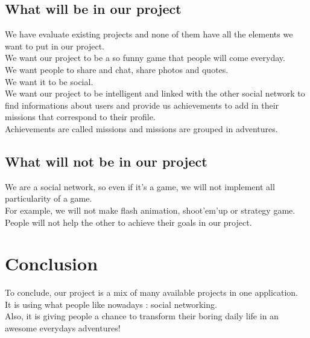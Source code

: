 \documentclass{life-en}
\begin{document}
\section{What will be in our project}

We have evaluate existing projects and none of them have all the elements we want to put in our project.\\

We want our project to be a so funny game that people will come everyday.\\

We want people to share and chat, share photos and quotes.\\

We want it to be social.\\

We want our project to be intelligent and linked with the other social network to find informations about users and provide us achievements to add in their missions that correspond to their profile.\\

Achievements are called missions and missions are grouped in adventures.

\section{What will not be in our project}

We are a social network, so even if it’s a game, we  will not implement all particularity of a game.\\

For example, we will not make flash animation, shoot’em’up or strategy game.\\

People will not help the other to achieve their goals in our project.

\chapter{Conclusion}

To conclude, our project is a mix of many available projects in one application.\\


It is using what people like nowadays : social networking.\\


Also, it is giving people a chance to transform their boring daily life in an awesome everydays adventures!
\end{document}
